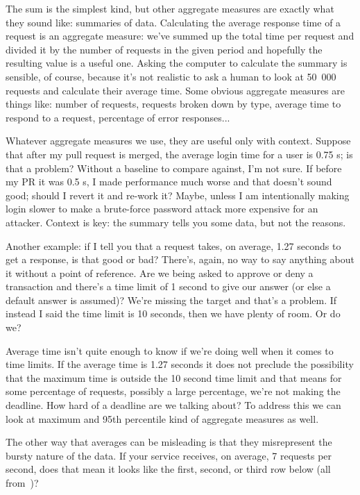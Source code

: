 The sum is the simplest kind, but other aggregate measures are exactly what they sound like: summaries of data. Calculating the average response time of a request is an aggregate measure: we've summed up the total time per request and divided it by the number of requests in the given period and hopefully the resulting value is a useful one. Asking the computer to calculate the summary is sensible, of course, because it's not realistic to ask a human to look at 50~000 requests and calculate their average time. Some obvious aggregate measures are things like: number of requests, requests broken down by type, average time to respond to a request, percentage of error responses...

Whatever aggregate measures we use, they are useful only with context. Suppose that after my pull request is merged, the average login time for a user is 0.75 s; is that a problem? Without a baseline to compare against, I'm not sure. If before my PR it was 0.5 s, I made performance much worse and that doesn't sound good; should I revert it and re-work it? Maybe, unless I am intentionally making login slower to make a brute-force password attack more expensive for an attacker. Context is key: the summary tells you some data, but not the reasons.

Another example: if I tell you that a request takes, on average, 1.27 seconds to get a response, is that good or bad? There's, again, no way to say anything about it without a point of reference. Are we being asked to approve or deny a transaction and there's a time limit of 1 second to give our answer (or else a default answer is assumed)? We're missing the target and that's a problem. If instead I said the time limit is 10 seconds, then we have plenty of room. Or do we?

Average time isn't quite enough to know if we're doing well when it comes to time limits. If the average time is 1.27 seconds it does not preclude the possibility that the maximum time is outside the 10 second time limit and that means for some percentage of requests, possibly a large percentage, we're not making the deadline. How hard of a deadline are we talking about? To address this we can look at maximum and 95th percentile kind of aggregate measures as well.

The other way that averages can be misleading is that they misrepresent the bursty nature of the data. If your service receives, on average, 7 requests per second, does that mean it looks like the first, second, or third row below (all from~\cite{usd})?

